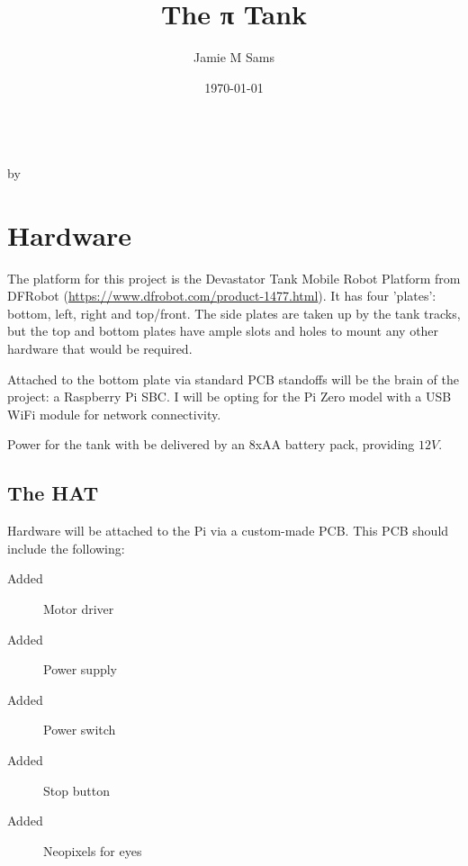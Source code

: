 \documentclass[a4paper,openany,oneside,nomultitoc]{dndbook}
\title{The π Tank}
\author{Jamie M Sams}
\date{\today}
\begin{document}
\DndSetThemeColor[DmgLavender]

\frontmatter

\begin{titlepage}
	\vspace*{\fill}
	\centering
	{\Huge \thetitle}\\
	\vspace*{\fill}
	{\large by \theauthor}
\end{titlepage}


\mainmatter%

\FloatBarrier
\chapter{Hardware}
\FloatBarrier
\begin{multicols*}{2}

The platform for this project is the Devastator Tank Mobile Robot Platform from DFRobot (\url{https://www.dfrobot.com/product-1477.html}).  It has four 'plates': bottom, left, right and top/front.  The side plates are taken up by the tank tracks, but the top and bottom plates have ample slots and holes to mount any other hardware that would be required.

Attached to the bottom plate via standard PCB standoffs will be the brain of the project: a Raspberry Pi SBC.  I will be opting for the Pi Zero model with a USB WiFi module for network connectivity.

Power for the tank with be delivered by an 8xAA battery pack, providing $12V$.

\section{The HAT}

Hardware will be attached to the Pi via a custom-made PCB.  This PCB should include the following:
\begin{description}
\item[Added]Motor driver
\item[Added]Power supply
\item[Added]Power switch
\item[Added]Stop button
\item[Added]Neopixels for eyes
\end{description}

\end{multicols*}
\end{document}
